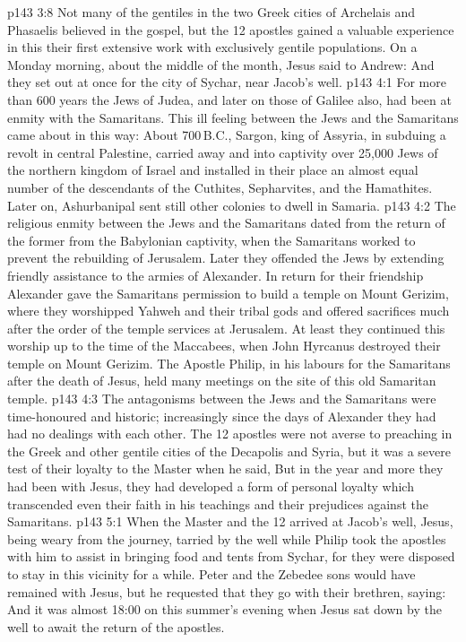 \vs p143 3:8 \pc Not many of the gentiles in the two Greek cities of Archelais and Phasaelis believed in the gospel, but the 12 apostles gained a valuable experience in this their first extensive work with exclusively gentile populations. On a Monday morning, about the middle of the month, Jesus said to Andrew:  And they set out at once for the city of Sychar, near Jacob’s well.
\vs p143 4:1 For more than 600 years the Jews of Judea, and later on those of Galilee also, had been at enmity with the Samaritans. This ill feeling between the Jews and the Samaritans came about in this way: About 700\,B.C., Sargon, king of Assyria, in subduing a revolt in central Palestine, carried away and into captivity over 25,000 Jews of the northern kingdom of Israel and installed in their place an almost equal number of the descendants of the Cuthites, Sepharvites, and the Hamathites. Later on, Ashurbanipal sent still other colonies to dwell in Samaria.
\vs p143 4:2 The religious enmity between the Jews and the Samaritans dated from the return of the former from the Babylonian captivity, when the Samaritans worked to prevent the rebuilding of Jerusalem. Later they offended the Jews by extending friendly assistance to the armies of Alexander. In return for their friendship Alexander gave the Samaritans permission to build a temple on Mount Gerizim, where they worshipped Yahweh and their tribal gods and offered sacrifices much after the order of the temple services at Jerusalem. At least they continued this worship up to the time of the Maccabees, when John Hyrcanus destroyed their temple on Mount Gerizim. The Apostle Philip, in his labours for the Samaritans after the death of Jesus, held many meetings on the site of this old Samaritan temple.
\vs p143 4:3 The antagonisms between the Jews and the Samaritans were time\hyp{}honoured and historic; increasingly since the days of Alexander they had had no dealings with each other. The 12 apostles were not averse to preaching in the Greek and other gentile cities of the Decapolis and Syria, but it was a severe test of their loyalty to the Master when he said,  But in the year and more they had been with Jesus, they had developed a form of personal loyalty which transcended even their faith in his teachings and their prejudices against the Samaritans.
\vs p143 5:1 When the Master and the 12 arrived at Jacob’s well, Jesus, being weary from the journey, tarried by the well while Philip took the apostles with him to assist in bringing food and tents from Sychar, for they were disposed to stay in this vicinity for a while. Peter and the Zebedee sons would have remained with Jesus, but he requested that they go with their brethren, saying:  And it was almost 18:00 on this summer’s evening when Jesus sat down by the well to await the return of the apostles.
